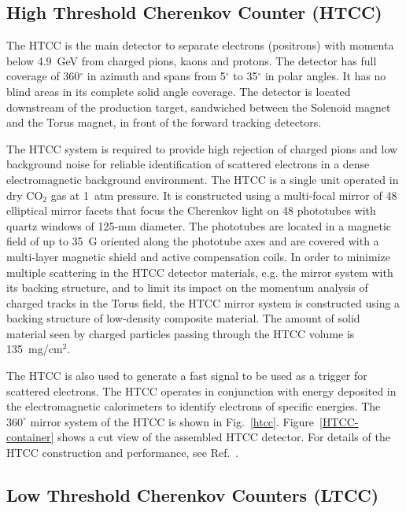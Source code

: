 \documentclass[final,3p,twocolumn]{elsarticle}
\begin{document}
\subsection{High Threshold Cherenkov Counter (HTCC)}


The HTCC is the main detector to separate electrons (positrons) with momenta below 4.9~GeV from charged pions,
kaons and protons. The detector has full coverage of 360$^\circ$ in azimuth and spans from 5$^\circ$ to 35$^\circ$
in polar angles. It has no blind areas in its complete solid angle coverage. The detector is located downstream of the
production target, sandwiched between the Solenoid magnet and the Torus magnet, in front of the forward tracking
detectors. 

The HTCC system is required to provide high rejection of charged pions and low background noise for reliable 
identification of scattered electrons in a dense electromagnetic background environment. The HTCC is a single unit
operated in dry CO$_2$ gas at 1~atm pressure. It is constructed using a multi-focal mirror of 48 elliptical mirror
facets that focus the Cherenkov light on 48 phototubes with quartz windows of 125-mm diameter. The phototubes
are located in a magnetic field of up to 35~G oriented along the phototube axes and are covered with a multi-layer
magnetic shield and active compensation coils. In order to minimize multiple scattering in the HTCC detector materials,
e.g. the mirror system with its backing structure, and to limit its impact on the momentum analysis of charged tracks in
the Torus field, the HTCC mirror system is constructed using a backing structure of low-density composite material. 
The amount of solid material seen by charged particles passing through the HTCC volume is 135~mg/cm$^2$. 

The HTCC is also used to generate a fast signal to be used as a trigger for scattered electrons. The HTCC operates
in conjunction with energy deposited in the electromagnetic calorimeters to identify electrons of specific energies.
The $360^\circ$ mirror system of the HTCC is shown in Fig.~\ref{htcc}. Figure~\ref{HTCC-container} shows a cut view
of the assembled HTCC detector. For details of the HTCC construction and performance, see Ref.~\cite{HTCC}.   


\subsection{Low Threshold Cherenkov Counters (LTCC)}
\end{document}
